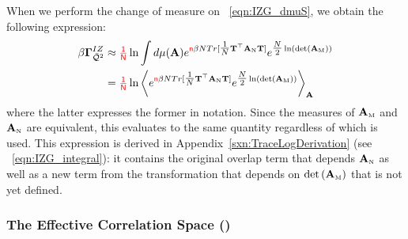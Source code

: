 
When we perform the change of measure on
\EQN~\ref{eqn:IZG_dmuS},
we obtain the following expression: %
\begin{align}
  \label{eqn:IFA2_integral}
  \nonumber 
  \beta\mathbf{\Gamma}^{IZ}_{\bar{\mathcal{Q}}^{2}} 
  &\approx 
    {\color{red}\sf{\tfrac{1}{N}}}
  \ln \int d\mu(\mathbf{A})
  e^{{\color{red}\sf{n}}\beta N Tr[\tfrac{1}{N}{\mathbf{T}}^{\top}{\mathbf{A}}_{\text{\tiny N}}{\mathbf{T}}] }
  e^{\tfrac{N}{2}\ln(\mbox{}{\text{det}}\left({\mathbf{A}}_{\text{\tiny M}}\right))} \\
  & = 
  {\color{red}\sf{\tfrac{1}{N}}}
  \ln
  \left\langle
  e^{{\color{red}\sf{n}}\beta N Tr[\tfrac{1}{N}{\mathbf{T}}^{\top}{\mathbf{A}}_{\text{\tiny N}}{\mathbf{T}}] }
  e^{\tfrac{N}{2}\ln(\mbox{}{\text{det}}\left({\mathbf{A}}_{\text{\tiny M}}\right))}
    \right\rangle_{\mathbf{A}}
\end{align}
where the latter expresses the former in \BraKet notation. Since the measures of ${\mathbf{A}}_{\text{\tiny M}}$ and ${\mathbf{A}}_{\text{\tiny N}}$ are equivalent, this evaluates to the same quantity regardless of which is used.
This expression is derived in Appendix~\ref{sxn:TraceLogDerivation} (see \EQN~\ref{eqn:IZG_integral}):
it contains the original overlap term that depends ${\mathbf{A}}_{\text{\tiny N}}$ as well as a new term from
the transformation that depends on $\mbox{}{\text{det}}\left({\mathbf{A}}_{\text{\tiny M}}\right)$ that is not yet defined.


\subsubsection{The Effective Correlation Space (\ECS)}

